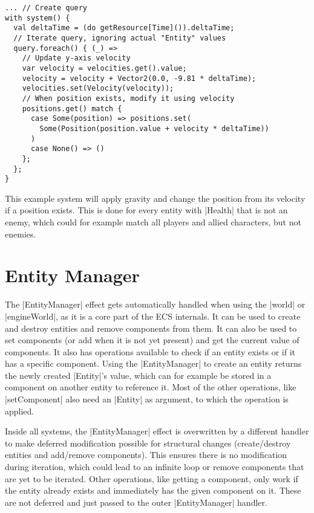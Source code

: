 \begin{lstlisting}[caption=System example for gravity]
... // Create query
with system() {
  val deltaTime = (do getResource[Time]()).deltaTime;
  // Iterate query, ignoring actual "Entity" values
  query.foreach() { (_) =>
    // Update y-axis velocity
    var velocity = velocities.get().value;
    velocity = velocity + Vector2(0.0, -9.81 * deltaTime);
    velocities.set(Velocity(velocity));
    // When position exists, modify it using velocity
    positions.get() match {
      case Some(position) => positions.set(
        Some(Position(position.value + velocity * deltaTime))
      )
      case None() => ()
    };
  };
}
\end{lstlisting}

This example system will apply gravity and change the position from its velocity if a position exists. This is done for every entity with |Health| that is not an enemy, which could for example match all players and allied characters, but not enemies.

\section{Entity Manager}

The |EntityManager| effect gets automatically handled when using the |world| or |engineWorld|, as it is a core part of the ECS internals. It can be used to create and destroy entities and remove components from them. It can also be used to set components (or add when it is not yet present) and get the current value of components. It also has operations available to check if an entity exists or if it has a specific component. Using the |EntityManager| to create an entity returns the newly created |Entity|'s value, which can for example be stored in a component on another entity to reference it. Most of the other operations, like |setComponent| also need an |Entity| as argument, to which the operation is applied.

Inside all systems, the |EntityManager| effect is overwritten by a different handler to make deferred modification possible for structural changes (create/destroy entities and add/remove components). This ensures there is no modification during iteration, which could lead to an infinite loop or remove components that are yet to be iterated. Other operations, like getting a component, only work if the entity already exists and immediately has the given component on it. These are not deferred and just passed to the outer |EntityManager| handler.
